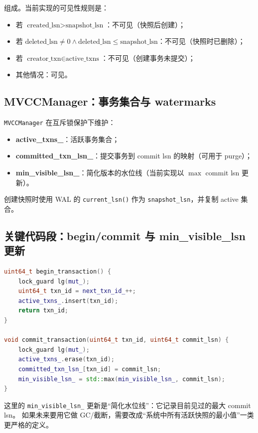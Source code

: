 组成。当前实现的可见性规则是：

\begin{itemize}
  \item 若 \(\text{created\_lsn} > \text{snapshot\_lsn}\)：不可见（快照后创建）；
  \item 若 \(\text{deleted\_lsn} \neq 0 \land \text{deleted\_lsn} \le \text{snapshot\_lsn}\)：不可见（快照时已删除）；
  \item 若 \(\text{creator\_txn} \in \text{active\_txns}\)：不可见（创建事务未提交）；
  \item 其他情况：可见。
\end{itemize}

\subsection{MVCCManager：事务集合与 watermarks}

\texttt{MVCCManager} 在互斥锁保护下维护：

\begin{itemize}
  \item \textbf{active\_txns\_}：活跃事务集合；
  \item \textbf{committed\_txn\_lsn\_}：提交事务到 commit lsn 的映射（可用于 purge）；
  \item \textbf{min\_visible\_lsn\_}：简化版本的水位线（当前实现以 \(\max\) commit lsn 更新）。
\end{itemize}

创建快照时使用 WAL 的 \texttt{current\_lsn()} 作为 \texttt{snapshot\_lsn}，并复制 active 集合。

\subsection{关键代码段：begin/commit 与 min\_visible\_lsn 更新}

\begin{lstlisting}[language=C++,caption={MVCCManager 的事务状态变迁（节选）}]
uint64_t begin_transaction() {
    lock_guard lg(mut_);
    uint64_t txn_id = next_txn_id_++;
    active_txns_.insert(txn_id);
    return txn_id;
}

void commit_transaction(uint64_t txn_id, uint64_t commit_lsn) {
    lock_guard lg(mut_);
    active_txns_.erase(txn_id);
    committed_txn_lsn_[txn_id] = commit_lsn;
    min_visible_lsn_ = std::max(min_visible_lsn_, commit_lsn);
}
\end{lstlisting}

这里的 \texttt{min\_visible\_lsn\_} 更新是“简化水位线”：它记录目前见过的最大 commit lsn。
如果未来要用它做 GC/截断，需要改成“系统中所有活跃快照的最小值”一类更严格的定义。


